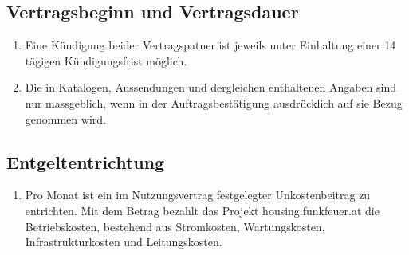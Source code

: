 \documentclass[parskip=half]{article}
\begin{document}
\subsection{Vertragsbeginn und Vertragsdauer}
\begin{enumerate}
\item Eine Kündigung beider Vertragspatner ist jeweils unter Einhaltung einer 14 tägigen
Kündigungsfrist möglich.
\item Die in Katalogen, Aussendungen und dergleichen enthaltenen Angaben sind nur
massgeblich, wenn in der Auftragsbestätigung ausdrücklich auf sie Bezug genommen
wird.
\end{enumerate}

\subsection{Entgeltentrichtung}
\begin{enumerate}
\item Pro Monat ist ein im Nutzungsvertrag festgelegter Unkostenbeitrag zu entrichten. Mit dem
Betrag bezahlt das Projekt housing.funkfeuer.at die Betriebskosten, bestehend aus
Stromkosten, Wartungskosten, Infrastrukturkosten und Leitungskosten.
\end{enumerate}
\end{document}
